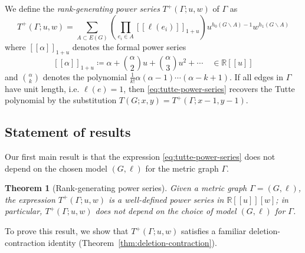 \documentclass{amsart}
\newtheorem{thm}{Theorem}
\theoremstyle{definition}
\newcommand{\RR}{\mathbb{R}}
\newcommand{\fanalog}[2]{[\![#2]\!]_{#1}}
\begin{document}
We define the {\em rank-generating power series}
$T^+(\Gamma; u,w)$ %
of $\Gamma$ as
\begin{equation}
\label{eq:tutte-power-series}
	T^+(\Gamma; u,w) = \sum_{A \subset E(G)} \left( \prod_{e_i \in A} \fanalog{1 + u}{\ell(e_i)} \right)
	u^{h_0(G\backslash A) - 1}w^{h_1(G\backslash A)} 
\end{equation}
where $\fanalog{1 + u}{\alpha}$ denotes the formal power series  
\begin{equation}\label{eq:f-analog}
	\fanalog{1 + u}{\alpha} \coloneq \alpha + \binom{\alpha}{2} u + \binom{\alpha}{3} u^2 + \cdots
	\quad \in \RR[[u]]
\end{equation}
and
$\binom{\alpha}{k}$ %
denotes the polynomial
$\displaystyle \frac1{k!}\alpha(\alpha - 1) \cdots (\alpha - k + 1)$.
If all edges in $\Gamma$ have unit length, i.e. $\ell(e) = 1$, then \eqref{eq:tutte-power-series} recovers the Tutte polynomial by the substitution $T(G; x, y) = T^+(\Gamma; x - 1, y - 1)$.

\subsection{Statement of results}
Our first main result is that the expression \eqref{eq:tutte-power-series} does not depend on the chosen model $(G,\ell)$ for the metric graph $\Gamma$.
\begin{thm}[Rank-generating power series]
\label{thm:intro-tutte-series}
Given a metric graph $\Gamma = (G,\ell)$,
the expression $T^+(\Gamma; u,w)$
is a well-defined power series in
$\RR[\![u]\!][w]$;
in particular,
$T^+(\Gamma; u,w)$ does not depend on the choice of model $(G,\ell)$ for $\Gamma$.
\end{thm}

To prove this result, we show that $T^+(\Gamma; u, w)$ satisfies a familiar deletion-contraction identity (Theorem~\ref{thm:deletion-contraction}).
\end{document}
